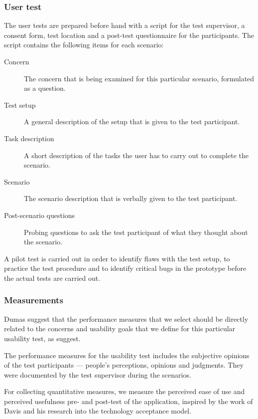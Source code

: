 \subsubsection{User test}
The user tests are prepared before hand with a script for the test supervisor, a consent form, test location and a post-test questionnaire for the participants. The script contains the following items for each scenario:

\begin{description}
  \item[Concern] The concern that is being examined for this particular scenario, formulated as a question.
  \item[Test setup] A general description of the setup that is given to the test participant.
  \item[Task description] A short description of the tasks the user has to carry out to complete the scenario.
  \item[Scenario] The scenario description that is verbally given to the test participant.
  \item[Post-scenario questions] Probing questions to ask the test participant of what they thought about the scenario.
\end{description}

A pilot test is carried out in order to identify flaws with the test setup, to practice the test procedure and to identify critical bugs in the prototype before the actual tests are carried out.

\subsubsection{Measurements}
\label{subsubsec:measurements}
Dumas \cite{Dumas1999} suggest that the performance measures that we select should be directly related to the concerns and usability goals that we define for this particular usability test, as \cite{Dumas1999} suggest.

The performance measures for the usability test includes the subjective opinions of the test participants --- people's perceptions, opinions and judgments. They were documented by the test supervisor during the scenarios.

For collecting quantitative measures, we measure the perceived ease of use and perceived usefulness pre- and post-test of the application, inspired by the work of Davis\cite{Davis1989} and his research into the technology acceptance model.
